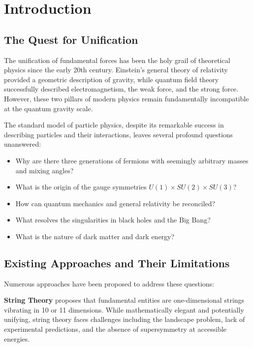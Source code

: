 \section{Introduction}
\label{sec:introduction}

\subsection{The Quest for Unification}

The unification of fundamental forces has been the holy grail of theoretical physics since the early 20th century. Einstein's general theory of relativity provided a geometric description of gravity, while quantum field theory successfully described electromagnetism, the weak force, and the strong force. However, these two pillars of modern physics remain fundamentally incompatible at the quantum gravity scale.

The standard model of particle physics, despite its remarkable success in describing particles and their interactions, leaves several profound questions unanswered:
\begin{itemize}
    \item Why are there three generations of fermions with seemingly arbitrary masses and mixing angles?
    \item What is the origin of the gauge symmetries $U(1) \times SU(2) \times SU(3)$?
    \item How can quantum mechanics and general relativity be reconciled?
    \item What resolves the singularities in black holes and the Big Bang?
    \item What is the nature of dark matter and dark energy?
\end{itemize}

\subsection{Existing Approaches and Their Limitations}

Numerous approaches have been proposed to address these questions:

\textbf{String Theory} proposes that fundamental entities are one-dimensional strings vibrating in 10 or 11 dimensions. While mathematically elegant and potentially unifying, string theory faces challenges including the landscape problem, lack of experimental predictions, and the absence of supersymmetry at accessible energies.

